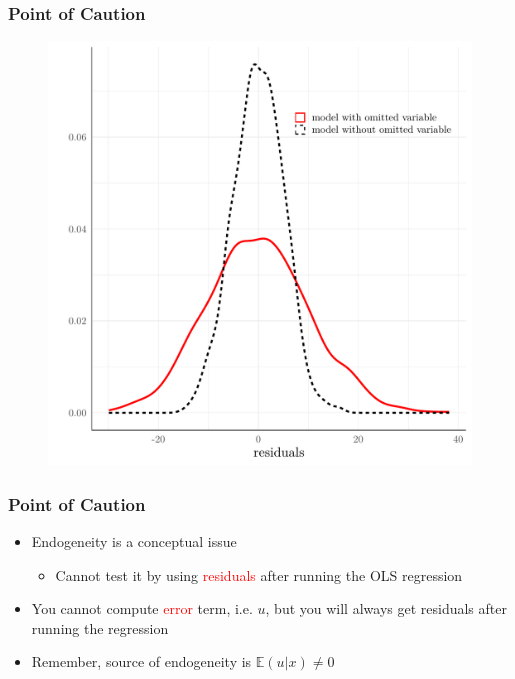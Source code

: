\documentclass{beamer}
\begin{document}
\begin{frame}
	\frametitle{Point of Caution}
	\begin{figure}
		\centering
		\includegraphics[width=0.7\linewidth]{figures/ovb-residuals}
	\end{figure}
\end{frame}


\begin{frame}
	\frametitle{Point of Caution}
	\begin{itemize}
		\item Endogeneity is a conceptual issue
		\begin{itemize}
			\item Cannot test it by using \textcolor{red}{residuals} after running the OLS regression
		\end{itemize}
		\item You cannot compute \textcolor{red}{error} term, i.e. $u$, but you will always get residuals after running the regression
		\item Remember, source of endogeneity is $\mathbb E(u|x) \neq 0$
	\end{itemize}
\end{frame}
\end{document}
